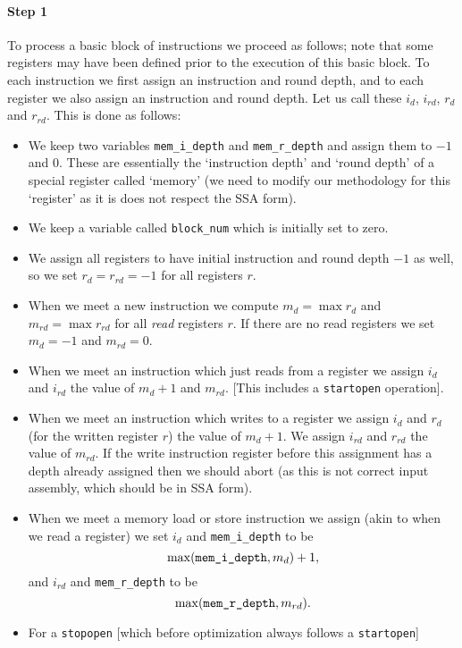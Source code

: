 \paragraph{Step 1}
To process a basic block of instructions we proceed as follows; note
that some registers may have been defined prior to the execution
of this basic block.
To each instruction we first assign an instruction and round depth,
and to each register we also assign an instruction and round depth.
Let us call these $i_d$, $i_{rd}$, $r_d$ and $r_{rd}$.
This is done as follows:
\begin{itemize}
  \item We keep two variables \verb+mem_i_depth+ and \verb+mem_r_depth+
         and assign them to $-1$ and $0$. These are essentially the `instruction depth'
                and `round depth' of a special register called `memory' (we need to modify
                our methodology for this `register' as it is does not respect the SSA form).
  \item We keep a variable called \verb+block_num+ which is initially set to zero.
  \item We assign all registers to have initial instruction and round depth $-1$
        as well, so we set $r_d=r_{rd}=-1$ for all registers $r$.
  \item When we meet a new instruction we compute $m_d = \max r_d$ and
         $m_{rd} = \max r_{rd}$ for all {\em read} registers $r$. If there are no
         read registers we set $m_d=-1$ and $m_{rd}=0$.
  \item When we meet an instruction which just reads from a register
        we assign $i_d$ and $i_{rd}$ the value of $m_d+1$ and $m_{rd}$.
        [This includes a \verb+startopen+ operation].
  \item When we meet an instruction which writes to a register
    we assign $i_d$ and $r_d$ (for the written register $r$) the value of $m_d+1$.
    We assign $i_{rd}$ and $r_{rd}$ the value of $m_{rd}$.
    If the write instruction register before this assignment has a depth
    already assigned then we should abort (as this is not correct input assembly, which should
    be in SSA form).
  \item When we meet a memory load or store instruction we assign (akin to when
    we read a register) we set $i_d$ and \verb+mem_i_depth+ to be
    \[ \max(\verb+mem_i_depth+, m_d)+1, \]
    and $i_{rd}$ and \verb+mem_r_depth+ to be
    \[ \max(\verb+mem_r_depth+, m_{rd}). \]
  \item For a \verb+stopopen+ [which before optimization always follows a \verb+startopen+]

\end{itemize}
